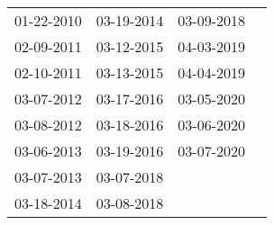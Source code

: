 \begin{supertabular}{llll}
 01-22-2010 &  03-19-2014 &  03-09-2018 \\
 02-09-2011 &  03-12-2015 &  04-03-2019 \\
 02-10-2011 &  03-13-2015 &  04-04-2019 \\
 03-07-2012 &  03-17-2016 &  03-05-2020 \\
 03-08-2012 &  03-18-2016 &  03-06-2020 \\
 03-06-2013 &  03-19-2016 &  03-07-2020 \\
 03-07-2013 &  03-07-2018 &             \\
 03-18-2014 &  03-08-2018 &             \\
\end{supertabular}
